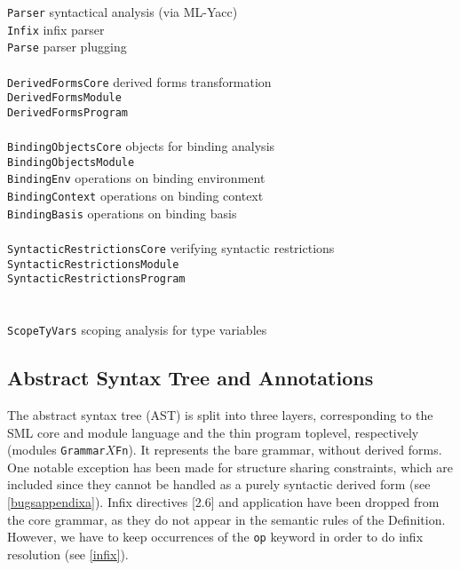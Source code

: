 \documentclass[twoside,titlepage]{article}
\begin{document}
\begin{quoting}
\begin{tabbing}
{\tt Parser}		\> syntactical analysis (via ML-Yacc) \\
{\tt Infix}		\> infix parser \\
{\tt Parse}		\> parser plugging \\
\\
{\tt DerivedFormsCore}	\> derived forms transformation \\
{\tt DerivedFormsModule} \> \\
{\tt DerivedFormsProgram} \> \\
\\
{\tt BindingObjectsCore} \> objects for binding analysis \\
{\tt BindingObjectsModule} \> \\
{\tt BindingEnv}	\> operations on binding environment \\
{\tt BindingContext}	\> operations on binding context \\
{\tt BindingBasis}	\> operations on binding basis \\
\\
{\tt SyntacticRestrictionsCore}	\> verifying syntactic restrictions \\
{\tt SyntacticRestrictionsModule} \> \\
{\tt SyntacticRestrictionsProgram} \> \\
\\
\hspace{-1em}{\tt elab/} \\
{\tt ScopeTyVars}	\> scoping analysis for type variables\\
\end{tabbing}
\end{quoting}


\subsection{Abstract Syntax Tree and Annotations}
\label{ast}

The abstract syntax tree (AST) is split into three layers, corresponding to the SML core and module language and the thin program toplevel, respectively (modules {\tt Grammar$X$Fn}). It represents the bare grammar, without derived forms. One notable exception has been made for structure sharing constraints, which are included since they cannot be handled as a purely syntactic derived form (see \ref{bugsappendixa}). Infix directives [2.6] and application have been dropped from the core grammar, as they do not appear in the semantic rules of the Definition. However, we have to keep occurrences of the {\tt op} keyword in order to do infix resolution (see \ref{infix}).
\end{document}
